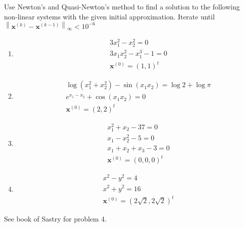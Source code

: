 \documentclass[../main-sheet.tex]{subfiles}
\begin{document}
\begin{prob}
    Use Newton's and Quasi-Newton's method to find a solution to the following non-linear systems with the given initial approximation. Iterate until \(\left\|\mathbf{x}^{(k)}-\mathbf{x}^{(k-1)}\right\|_\infty<10^{-6}\)
    \begin{enumerate}
        \item \begin{align*}
            &3x_1^2-x_2^2=0\\
            &3x_1x_2^2-x_1^3-1=0\\
            &\mathbf{x}^{(0)}=(1,1)^t
        \end{align*}
        \item \begin{align*}
            &\log \left( x_1^2+x_2^2 \right)-\sin(x_1x_2)=\log 2+\log \pi\\
            &e^{x_1-x_2}+\cos (x_1x_2)=0\\
            &\mathbf{x}^{(0)}=(2,2)^t
        \end{align*}
        \item \begin{align*}
            &x_1^2+x_2-37=0\\
            &x_1-x_2^2-5=0\\
            &x_1+x_2+x_3-3=0\\
            &\mathbf{x}^{(0)}=(0,0,0)^t
        \end{align*}
        \item \begin{align*}
            &x^2-y^2=4\\
            &x^2+y^2=16\\
            &\mathbf{x}^{(0)}=(2\sqrt{2},2\sqrt{2})^t
        \end{align*}
    \end{enumerate}
    See book of Sastry for problem 4.
\end{prob}
\end{document}
